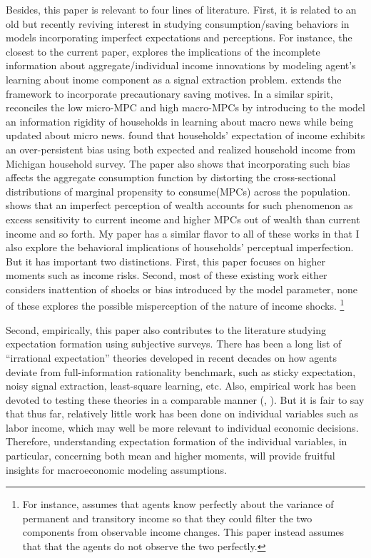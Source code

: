 \documentclass[12pt,notitlepage,onecolumn,aps,pra]{article}
\begin{document}
Besides, this paper is relevant to four lines of literature. First, it
is related to an old but recently reviving interest in studying
consumption/saving behaviors in models incorporating imperfect
expectations and perceptions. For instance, the closest to the current
paper, \cite{pischke1995individual} explores the implications of the
incomplete information about aggregate/individual income innovations by
modeling agent's learning about inome component as a signal extraction
problem. \cite{wang2004precautionary} extends the framework to
incorporate precautionary saving motives. In a similar spirit,
\cite{carroll_sticky_2018} reconciles the low micro-MPC and high
macro-MPCs by introducing to the model an information rigidity of
households in learning about macro news while being updated about micro
news. \cite{rozsypal_overpersistence_2017} found that households'
expectation of income exhibits an over-persistent bias using both
expected and realized household income from Michigan household survey.
The paper also shows that incorporating such bias affects the aggregate
consumption function by distorting the cross-sectional distributions of
marginal propensity to consume(MPCs) across the population.
\cite{lian2019imperfect} shows that an imperfect perception of wealth
accounts for such phenomenon as excess sensitivity to current income and
higher MPCs out of wealth than current income and so forth. My paper has
a similar flavor to all of these works in that I also explore the
behavioral implications of households' perceptual imperfection. But it
has important two distinctions. First, this paper focuses on higher
moments such as income risks. Second, most of these existing work either
considers inattention of shocks or bias introduced by the model
parameter, none of these explores the possible misperception of the
nature of income shocks.
\footnote{For instance, \cite{pischke1995individual} assumes that agents know perfectly about the variance of permanent and transitory income so that they could filter the two components from observable income changes. This paper instead assumes that that the agents do not observe the two perfectly.}

Second, empirically, this paper also contributes to the literature
studying expectation formation using subjective surveys. There has been
a long list of ``irrational expectation'' theories developed in recent
decades on how agents deviate from full-information rationality
benchmark, such as sticky expectation, noisy signal extraction,
least-square learning, etc. Also, empirical work has been devoted to
testing these theories in a comparable manner (\cite{coibion2012can},
\cite{fuhrer2018intrinsic}). But it is fair to say that thus far,
relatively little work has been done on individual variables such as
labor income, which may well be more relevant to individual economic
decisions. Therefore, understanding expectation formation of the
individual variables, in particular, concerning both mean and higher
moments, will provide fruitful insights for macroeconomic modeling
assumptions.
\end{document}
